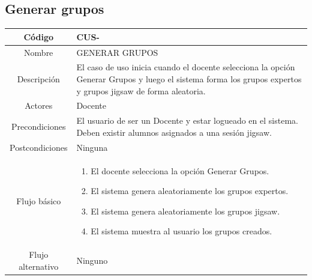 \subsection{Generar grupos}
\begin{longtable}{|c|L{10cm}|}
	\hline
	Código &  CUS-\casodeuso\\  \hline
	Nombre &  GENERAR GRUPOS\\  \hline
	Descripción &  El caso de uso inicia cuando el docente selecciona la opción Generar Grupos y luego el sistema forma los grupos expertos y grupos jigsaw de forma aleatoria.\\  \hline
	Actores &  Docente\\  \hline
	Precondiciones &  El usuario de ser un Docente y estar logueado en el sistema. Deben existir alumnos asignados a una sesión jigsaw.\\  \hline
	Postcondiciones &  Ninguna\\  \hline
	Flujo básico &    \begin{enumerate}
		\item El docente selecciona la opción Generar Grupos.
		\item El sistema genera aleatoriamente los grupos expertos.
		\item El sistema genera aleatoriamente los grupos jigsaw.
		\item El sistema muestra al usuario los grupos creados.
	\end{enumerate}  \\ \hline
	Flujo alternativo & Ninguno \\  \hline
\end{longtable}
\clearpage
